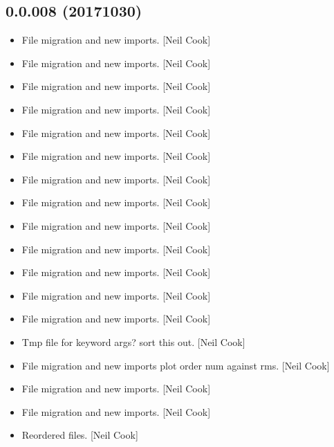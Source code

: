 \documentclass[a4paper,10pt,english]{report}
\begin{document}
\subsection{0.0.008 (2017\sphinxhyphen{}10\sphinxhyphen{}30)}
\label{\detokenize{misc/changelog:id561}}\begin{itemize}
\item {} 
File migration and new imports. {[}Neil Cook{]}

\item {} 
File migration and new imports. {[}Neil Cook{]}

\item {} 
File migration and new imports. {[}Neil Cook{]}

\item {} 
File migration and new imports. {[}Neil Cook{]}

\item {} 
File migration and new imports. {[}Neil Cook{]}

\item {} 
File migration and new imports. {[}Neil Cook{]}

\item {} 
File migration and new imports. {[}Neil Cook{]}

\item {} 
File migration and new imports. {[}Neil Cook{]}

\item {} 
File migration and new imports. {[}Neil Cook{]}

\item {} 
File migration and new imports. {[}Neil Cook{]}

\item {} 
File migration and new imports. {[}Neil Cook{]}

\item {} 
File migration and new imports. {[}Neil Cook{]}

\item {} 
File migration and new imports. {[}Neil Cook{]}

\item {} 
Tmp file for keyword args? \sphinxhyphen{} sort this out. {[}Neil Cook{]}

\item {} 
File migration and new imports plot order num against rms. {[}Neil Cook{]}

\item {} 
File migration and new imports. {[}Neil Cook{]}

\item {} 
File migration and new imports. {[}Neil Cook{]}

\item {} 
Reordered files. {[}Neil Cook{]}

\end{itemize}
\end{document}
